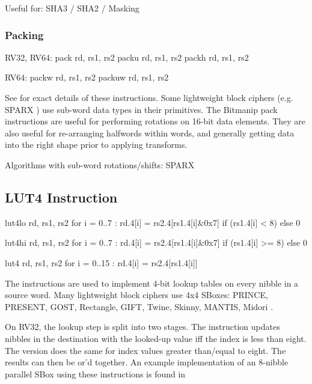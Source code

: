 Useful for: SHA3 / SHA2 / Masking

\subsubsection{Packing}

\begin{cryptobitmanipisa}
RV32, RV64: 
    pack   rd, rs1, rs2
    packu  rd, rs1, rs2
    packh  rd, rs1, rs2

RV64: 
    packw  rd, rs1, rs2
    packuw rd, rs1, rs2
\end{cryptobitmanipisa}

See \cite[Section 2.1.4]{riscv:bitmanip:draft} for exact details of
these instructions.
Some lightweight block ciphers
(e.g. SPARX \cite{DPUVGB:16})
use sub-word data types in their primitives.
The Bitmanip pack instructions are useful for performing rotations on
16-bit data elements.
They are also useful for re-arranging halfwords within words, and
generally getting data into the right shape prior to applying transforms.

Algorithms with sub-word rotations/shifts:
SPARX


\subsection{LUT4 Instruction}

\begin{cryptoisa}
lut4lo  rd, rs1, rs2
    for i = 0..7 : rd.4[i] = rs2.4[rs1.4[i]&0x7] if (rs1.4[i] <  8) else 0

lut4hi  rd, rs1, rs2
    for i = 0..7 : rd.4[i] = rs2.4[rs1.4[i]&0x7] if (rs1.4[i] >= 8) else 0

lut4    rd, rs1, rs2
    for i = 0..15 : rd.4[i] = rs2.4[rs1.4[i]]
\end{cryptoisa}

The  instructions are used to implement 4-bit lookup tables
on every nibble in a source word.
Many lightweight block ciphers use 4x4 SBoxes:
PRINCE\cite{block:prince},
PRESENT\cite{block:present},
GOST,
Rectangle\cite{block:rectangle},
GIFT\cite{block:gift},
Twine\cite{block:twine},
Skinny, MANTIS\cite{block:skinny},
Midori \cite{block:midori}.

On RV32, the lookup step is split into two stages.
The  instruction
updates nibbles in the destination with the looked-up value
iff the index is less than eight.
The  version does
the same for index values greater than/equal to eight.
The results can then be or'd together.
An example implementation of an $8$-nibble parallel SBox using these
instructions is found in 

